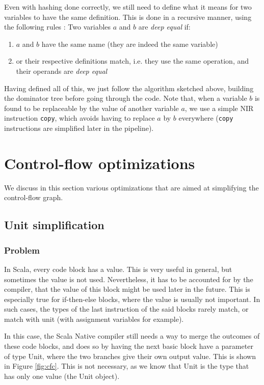 \documentclass[12pt,a4paper]{article}
\newcommand{\scala}[1]{\textsf{#1}}
\newcommand{\nir}[1]{\texttt{#1}}
\begin{document}
Even with hashing done correctly, we still need to define what it means for two variables to have the same definition. This is done in a recursive manner, using the following rules :
\newline
Two variables $a$ and $b$ are \textit{deep equal} if:
\begin{enumerate}
\item $a$ and $b$ have the same name (they are indeed the same variable)
\item or their respective definitions match, i.e. they use the same operation, and their operands are \textit{deep equal}
\end{enumerate}

Having defined all of this, we just follow the algorithm sketched above, building the dominator tree before going through the code. Note that, when a variable $b$ is found to be replaceable by the value of another variable $a$, we use a simple NIR instruction \nir{copy}, which avoids having to replace $a$ by $b$ everywhere (\nir{copy} instructions are simplified later in the pipeline).

\section{Control-flow optimizations}

We discuss in this section various optimizations that are aimed at simplifying the control-flow graph.

\subsection{Unit simplification}

\subsubsection*{Problem}

In Scala, every code block has a value. This is very useful in general, but sometimes the value is not used. Nevertheless, it has to be accounted for by the compiler, that the value of this block might be used later in the future. This is especially true for if-then-else blocks, where the value is usually not important. In such cases, the types of the last instruction of the said blocks rarely match, or match with unit (with assignment variables for example).


In this case, the Scala Native compiler still needs a way to merge the outcomes of these code blocks, and does so by having the next basic block have a parameter of type \scala{Unit}, where the two branches give their own output value. This is shown in Figure \ref{fig:cfc}. This is not necessary, as we know that \scala{Unit} is the type that has only one value (the \scala{Unit} object).
\end{document}
